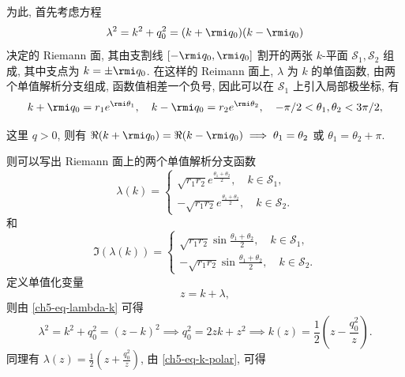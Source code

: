 为此, 首先考虑方程
\begin{equation}
    \lambda^{2} = k^{2} + q_{0}^{2} = (k+ \rmi q_{0})(k - \rmi q_{0}) \label{ch5-eq-lambda-k}
\end{equation}
决定的 Riemann 面, 其由支割线 $ [-\rmi q_{0}, \rmi q_{0}] $ 割开的两张 $ k$-平面 $ \mathcal{S}_{1}, \mathcal{S}_{2} $ 组成, 其中支点为 $ k = \pm \rmi q_{0} $. 在这样的 Reimann 面上, $ \lambda $ 为 $ k $ 的单值函数, 由两个单值解析分支组成, 函数值相差一个负号, 因此可以在 $ \mathcal{S}_{1}$ 上引入局部极坐标, 有
\begin{equation}
    k + \rmi q_{0} = r_{1} e^{\rmi \theta_{1}}, \quad k - \rmi q_{0} = r_{2} e^{\rmi \theta_{2}}, \quad -\pi/2 < \theta_{1}, \theta_{2} < 3\pi/2,
    \label{ch5-eq-k-polar}
\end{equation}
\begin{note}
    这里 $ q > 0 $, 则有 $ \Re(k+\rmi q_{0}) = \Re(k - \rmi q_{0}) \implies \theta_{1} = \theta_{2} $ 或 $ \theta_{1} = \theta_{2} + \pi $.
\end{note}
则可以写出 Riemann 面上的两个单值解析分支函数
\begin{equation}
    \lambda(k) = \begin{cases}
        \sqrt{r_{1} r_{2}} e^{\frac{\theta_{1} + \theta_{2}}{2}}, \quad k \in \mathcal{S}_{1}, \\
        -\sqrt{r_{1} r_{2}} e^{\frac{\theta_{1} + \theta_{2}}{2}}, \quad k \in \mathcal{S}_{2}.
    \end{cases}
\end{equation}
和
\begin{equation}
    \Im(\lambda(k)) = \begin{cases}
        \sqrt{r_{1} r_{2}} \sin\frac{\theta_{1} + \theta_{2}}{2}, \quad k \in \mathcal{S}_{1}, \\
        -\sqrt{r_{1} r_{2}} \sin\frac{\theta_{1} + \theta_{2}}{2}, \quad k \in \mathcal{S}_{2}.
    \end{cases}
\end{equation}
定义单值化变量
\begin{equation}
    z = k + \lambda,
    \label{ch5-eq-z-def}
\end{equation}
则由 \eqref{ch5-eq-lambda-k} 可得
\begin{equation}
    \lambda^{2} = k^{2} + q^{2}_{0} = (z-k)^{2} \implies q_{0}^{2} = 2 z k + z^{2} \implies k(z) = \frac{1}{2}(z - \frac{q_{0}^{2}}{z}).
    \label{ch5-eq-k-of-z}
\end{equation}
同理有 $ \lambda(z) = \frac{1}{2}(z + \frac{q_{0}^{2}}{z}) $, 由 \eqref{ch5-eq-k-polar}, 可得
